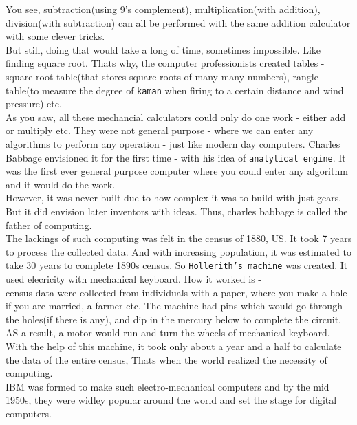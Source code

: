 \documentclass[11pt]{article}
\begin{document}
You see, subtraction(using 9's complement), multiplication(with addition), division(with subtraction) can all be performed with the same addition calculator with some clever tricks.\\

But still, doing that would take a long of time, sometimes impossible. Like finding square root. Thats why, the computer professionists created tables - square root table(that stores square roots of many many numbers), rangle table(to measure the degree of \texttt{kaman} when firing to a certain distance and wind pressure) etc.\\

As you saw, all these mechancial calculators could only do one work - either add or multiply etc. They were not general purpose - where we can enter any algorithms to perform any operation - just like modern day computers. Charles Babbage envisioned it for the first time - with his idea of \texttt{analytical engine}. It was the first ever general purpose computer where you could enter any algorithm and it would do the work.\\
However, it was never built due to how complex it was to build with just gears. But it did envision later inventors with ideas. Thus, charles babbage is called the father of computing.\\

The lackings of such computing was felt in the census of 1880, US. It took 7 years to process the collected data. And with increasing population, it was estimated to take 30 years to complete 1890s census. So \texttt{Hollerith's machine} was created. It used elecricity with mechanical keyboard. How it worked is -\\
census data were collected from individuals with a paper, where you make a hole if you are married, a farmer etc. The machine had pins which would go through the holes(if there is any), and dip in the mercury below to complete the circuit. AS a result, a motor would run and turn the wheels of mechanical keyboard.\\
With the help of this machine, it took only about a year and a half to calculate the data of the entire census, Thats when the world realized the necessity of computing.\\
IBM was formed to make such electro-mechanical computers and by the mid 1950s, they were widley popular around the world and set the stage for digital computers.\\
\end{document}
